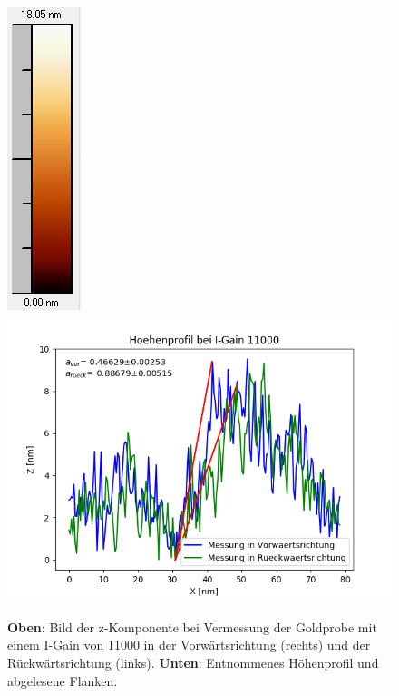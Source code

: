 \documentclass[12pt,a4paper]{article}
\begin{document}
\begin{figure}
\includegraphics[scale=0.6]{Bilder/Anhang/IGain/11000_IGain_nach_Skala.jpg}
\includegraphics[scale=0.6]{Bilder/Anhang/IGain/Profil_IGain_11000.png}
\caption{\textbf{Oben}: Bild der z-Komponente bei Vermessung der Goldprobe mit einem I-Gain von 11000 in der Vorwärtsrichtung (rechts) und der Rückwärtsrichtung (links). \textbf{Unten}: Entnommenes Höhenprofil und abgelesene Flanken.}
\end{figure}
\end{document}
